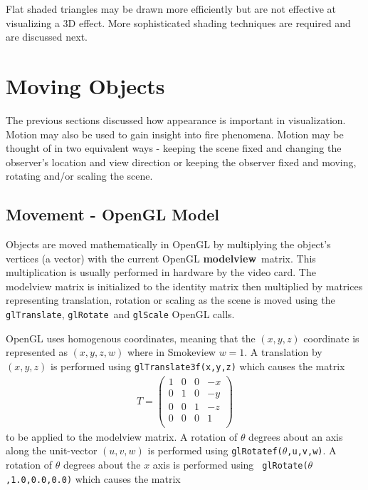 \documentclass[11pt,twoside]{book}
\begin{document}
Flat shaded triangles may be drawn more efficiently but are not
effective at visualizing a 3D effect.  More sophisticated shading
techniques are required and are discussed next.



%
%

\chapter{Moving Objects} The previous sections discussed how appearance
is important in visualization.  Motion may also be used to gain insight
into fire phenomena.
Motion may be thought of in two equivalent ways - keeping the
scene fixed and changing the observer's location and view
direction or keeping the observer fixed and moving, rotating
and/or scaling the scene.

\section{Movement - OpenGL Model}
Objects are moved mathematically in OpenGL by multiplying the
object's vertices (a vector) with the current OpenGL {\bf
modelview}\ matrix.  This multiplication is usually performed in
hardware by the video card.  The modelview matrix is initialized
to the identity matrix then multiplied by matrices representing
translation, rotation or scaling as the scene is moved using
the {\tt glTranslate}, {\tt glRotate}\ and {\tt glScale} OpenGL
calls.

OpenGL uses homogenous coordinates, meaning that
the $(x,y,z)$ coordinate is represented as $(x,y,z,w)$ where in
Smokeview $w=1$.  A translation by $(x,y,z)$ is performed using
{\tt glTranslate3f(x,y,z)} which causes the matrix
\begin{eqnarray*}
T=\left(%
\begin{array}{cccc}
  1 & 0 & 0 & -x \\
  0 & 1 & 0 & -y \\
  0 & 0 & 1 & -z \\
  0 & 0 & 0 & 1 \\
\end{array}%
\right)
\end{eqnarray*}
to be applied to the modelview matrix.  A rotation of $\theta$
degrees about an axis along the unit-vector $(u,v,w)$ is performed
using {\tt glRotatef($\theta$,u,v,w)}.  A rotation of $\theta$
degrees about the $x$ axis is performed using {\tt
glRotate($\theta$,1.0,0.0,0.0)} which causes the matrix
\end{document}

